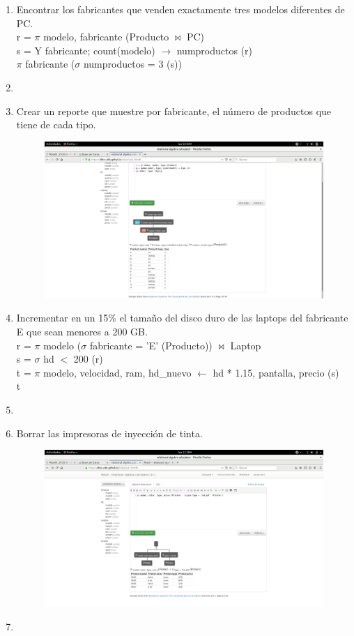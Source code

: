 \documentclass[a4paper, 12pt]{report}
\begin{document}
{\begin{enumerate}[label=\alph*)]
{\begin{figure}[H]
            {img/k.png}\hfill
    \end{figure}
}
\item{Encontrar los fabricantes que venden exactamente tres modelos 
	diferentes de PC.\\
	r = $\pi$ modelo, fabricante (Producto $\Join$ PC)\\
s = Y fabricante; count(modelo) $\rightarrow$ numproductos (r)\\
$\pi$ fabricante ($\sigma$ numproductos = 3 (s))}
\item{}
\item{Crear un reporte que muestre por fabricante, el número de productos que tiene de cada tipo.\\
    \begin{figure}[H]
        \includegraphics[width=\textwidth]
            {img/n.png}\hfill
    \end{figure}
}
\item{Incrementar en un 15\% el tamaño del disco duro de las laptops 
	del fabricante E que sean menores a 200 GB.\\
	r = $\pi$ modelo ($\sigma$ fabricante = 'E' (Producto)) $\Join$ Laptop\\
s = $\sigma$ hd $<$ 200 (r)\\
t = $\pi$ modelo, velocidad, ram, hd\_nuevo $\leftarrow$ hd * 1.15, pantalla, precio (s)\\
t}
\item{}
\item{Borrar las impresoras de inyección de tinta.\\
    \begin{figure}[H]
        \includegraphics[width=\textwidth]
            {img/p.png}\hfill
    \end{figure}}
\item{}
\end{enumerate}
}
\end{document}
